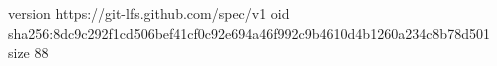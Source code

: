 version https://git-lfs.github.com/spec/v1
oid sha256:8dc9c292f1cd506bef41cf0c92e694a46f992c9b4610d4b1260a234c8b78d501
size 88
